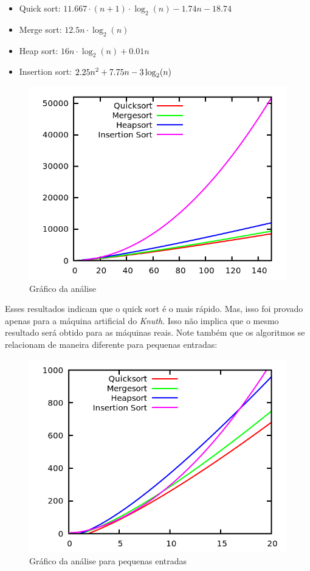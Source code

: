 \documentclass[fleqn,10pt]{SelfArx} %
\begin{document}
\begin{itemize}
\item Quick sort: $11.667 \cdot (n + 1) \cdot \log_2(n) - 1.74n - 18.74$
\item Merge sort: $12.5n \cdot \log_2(n)$
\item Heap sort: $16n \cdot \log_2(n) + 0.01n$
\item Insertion sort: $2.25n\textsuperscript{2} + 7.75n - 3\log_2(n)$
\end{itemize}

\begin{figure}[ht]\centering 
\includegraphics[width=\linewidth]{knuth1}
\caption{Gráfico da análise}
\label{fig:knuth1}
\end{figure}

Esses resultados indicam que o quick sort é o mais rápido. Mas, isso foi provado apenas para a máquina artificial 
do \emph{Knuth}. Isso não implica que o mesmo resultado será obtido para as máquinas reais. Note também que os 
algoritmos se relacionam de maneira diferente para pequenas entradas:

\begin{figure}[ht]\centering 
\includegraphics[width=\linewidth]{knuth2}
\caption{Gráfico da análise para pequenas entradas}
\label{fig:knuth2}
\end{figure}
\end{document}
